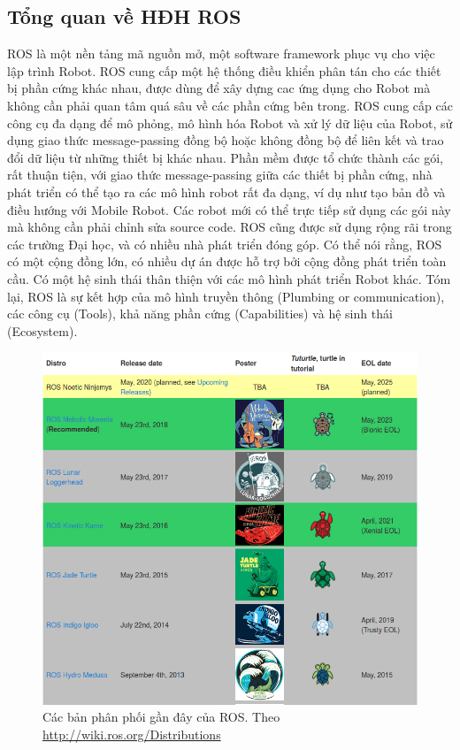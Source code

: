 \subsection{Tổng quan về HĐH ROS}
ROS là một nền tảng mã nguồn mở, một software framework phục vụ cho việc
lập trình Robot. ROS cung cấp một hệ thống điều khiển phân tán cho các thiết bị
phần cứng khác nhau, được dùng để xây dựng cac ứng dụng cho Robot mà không
cần phải quan tâm quá sâu về các phần cứng bên trong. ROS cung cấp các công cụ
đa dạng để mô phỏng, mô hình hóa Robot và xử lý dữ liệu của Robot, sử dụng giao
thức message-passing đồng bộ hoặc không đồng bộ để liên kết và trao đổi dữ liệu
từ những thiết bị khác nhau.
Phần mềm được tổ chức thành các gói, rất thuận tiện, với giao thức message-passing giữa các thiết bị phần cứng, nhà phát triển có thể tạo ra các mô hình robot
rất đa dạng, ví dụ như tạo bản đồ và điều hướng với Mobile Robot. Các robot mới
có thể trực tiếp sử dụng các gói này mà không cần phải chỉnh sửa source code.
ROS cũng được sử dụng rộng rãi trong các trường Đại học, và có nhiều nhà phát
triển đóng góp. Có thể nói rằng, ROS có một cộng đồng lớn, có nhiều dự án được
hỗ trợ bởi cộng đồng phát triển toàn cầu. Có một hệ sinh thái thân thiện với các
mô hình phát triển Robot khác.
Tóm lại, ROS là sự kết hợp của mô hình truyền thông (Plumbing or
communication), các công cụ (Tools), khả năng phần cứng (Capabilities) và hệ
sinh thái (Ecosystem).

\begin{figure}[htbp]
  \centering
  \includegraphics[width=0.9\linewidth]{figures/ROS-ditributions.png}
  \caption{Các bản phân phối gần đây của ROS. Theo \url{http://wiki.ros.org/Distributions}}
  \label{fig:ROS-distributions}
\end{figure}

